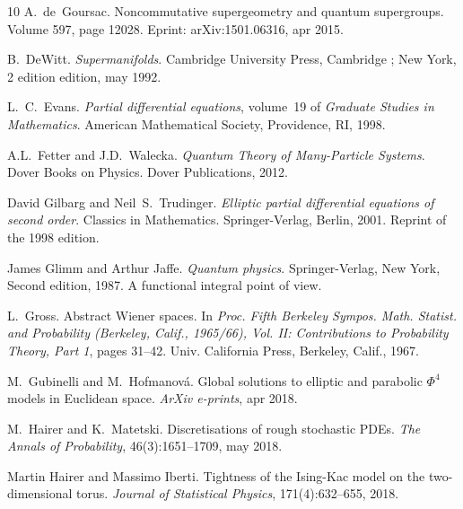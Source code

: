 \documentclass[a4paper,10pt]{article}
\newcommand{\tmtextit}[1]{{\itshape{#1}}}
\begin{document}
\begin{thebibliography}{10}
  A.~de~Goursac.
  {\newblock}Noncommutative supergeometry and quantum supergroups.
  {\newblock}Volume  597,  page  12028. Eprint: arXiv:1501.06316, apr
  2015.{\newblock}
  
  B.~DeWitt.
  {\newblock}\tmtextit{Supermanifolds}. {\newblock}Cambridge University Press,
  Cambridge ; New York, 2 edition  edition, may 1992.{\newblock}
  
  L.~C.~Evans. {\newblock}\tmtextit{Partial
  differential equations},  volume~19  of \tmtextit{Graduate Studies in
  Mathematics}. {\newblock}American Mathematical Society, Providence, RI,
  1998.{\newblock}
  
  A.L.~Fetter  and  J.D.~Walecka.
  {\newblock}\tmtextit{Quantum Theory of Many-Particle Systems}.
  {\newblock}Dover Books on Physics. Dover Publications, 2012.{\newblock}
  
  David Gilbarg  and  Neil~S.~Trudinger.
  {\newblock}\tmtextit{Elliptic partial differential equations of second
  order}. {\newblock}Classics in Mathematics. Springer-Verlag, Berlin, 2001.
  {\newblock}Reprint of the 1998 edition.{\newblock}
  
  James Glimm  and  Arthur Jaffe.
  {\newblock}\tmtextit{Quantum physics}. {\newblock}Springer-Verlag, New York,
  Second  edition, 1987. {\newblock}A functional integral point of
  view.{\newblock}
  
  L.~Gross. {\newblock}Abstract Wiener spaces.
  {\newblock}In \tmtextit{Proc. Fifth Berkeley Sympos. Math. Statist. and
  Probability (Berkeley, Calif., 1965/66), Vol. II: Contributions to
  Probability Theory, Part 1},  pages  31--42. Univ. California Press,
  Berkeley, Calif., 1967.{\newblock}
  
  M.~Gubinelli  and  M.~Hofmanov{\'a}. {\newblock}Global
  solutions to elliptic and parabolic $\Phi^4$ models in Euclidean space.
  {\newblock}\tmtextit{ArXiv e-prints}, apr 2018.{\newblock}
  
  M.~Hairer  and  K.~Matetski.
  {\newblock}Discretisations of rough stochastic PDEs.
  {\newblock}\tmtextit{The Annals of Probability}, 46(3):1651--1709, may
  2018.{\newblock}
  
  Martin Hairer  and  Massimo Iberti.
  {\newblock}Tightness of the Ising-Kac model on the two-dimensional torus.
  {\newblock}\tmtextit{Journal of Statistical Physics}, 171(4):632--655,
  2018.{\newblock}
  

\end{thebibliography}
\end{document}
